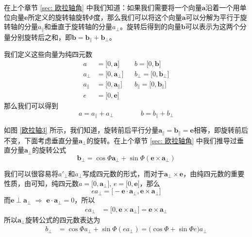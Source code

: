 在上个章节 \ref{sec: 欧拉轴角} 中我们知道：如果我们需要将一个向量$\bm{a}$沿着一个用单位向量$\bm{e}$所定义的旋转轴旋转$\varPhi$度，那么我们可以将这个向量$\bm{a}$可以分解为平行于旋转轴的分量$a_{\parallel}$和垂直于旋转轴的分量$a_{\perp}$。旋转后得到的向量$\bm{b}$可以表示为这两个分量分别旋转后之和，即$\bm{b} = \bm{b}_{\parallel} + \bm{b}_{\perp}$。

我们定义这些向量为纯四元数
\begin{align*}
	a &= \big[ 0, \bm{a} \big]  && b = \big[ 0, \bm{b} \big] \\
	a_\perp &= \big[ 0, \bm{a}_\perp \big] && b_\perp = \big[ 0, \bm{b}_\perp \big] \\
	a_\parallel &= \big[ 0, \bm{a}_\parallel \big] && b_\parallel = \big[ 0, \bm{b}_\parallel \big] \\
	e &= \big[0, \bm{e} \big] 
\end{align*}
那么我们可以得到
\begin{equation*}
	a = a_\parallel + a_\perp \qquad \qquad b = b_\parallel + b_\perp
\end{equation*}

如图 \ref{欧拉轴3} 所示，我们知道，旋转前后平行分量$\bm{a}_{\parallel} = \bm{b}_{\parallel} = \bm{e}$相等，即旋转前后不变，下面考虑垂直分量$\bm{a}_{\perp}$的旋转。在上个章节 \ref{sec: 欧拉轴角} 中我们推导过垂直分量$\bm{a}_{\perp}$的旋转公式
\begin{equation*}
	\bm{b}_{\perp} = \cos \varPhi \bm{a}_\perp + \sin \varPhi (\bm{e} \times \bm{a}_\perp )
\end{equation*}

我们可以很容易将$a'_\perp$和$a_\perp$写成四元数的形式，而对于$\bm{a}_\perp \times \bm{e}$，由纯四元数的重要性质，由可知，纯四元数$a = \big[ 0, \bm{a_\perp}\big], \, e = \big[ 0, \bm{e} \big]$，那么
\begin{equation*}
	ea_\perp = \big[ - \bm{e} \cdot \bm{a}_\perp, \bm{e} \times \bm{a}_\perp \big]
\end{equation*}
而$\bm{e} \perp \bm{a}_\perp \,\, \Rightarrow \,\, \bm{e} \cdot \bm{a}_\perp = 0$，所以
\begin{align*}
	ea_\perp & = \big[ 0, \bm{e} \times \bm{a}_\perp \big] = \bm{e} \times \bm{a}_\perp
\end{align*}
所以$\bm{a}_{\perp}$旋转公式的四元数表达为
\begin{align}
	b_\perp &= \cos \varPhi a_\perp + \sin \varPhi (ea_\perp) = \big( \cos \varPhi + \sin \varPhi e \big) a_\perp 
\end{align}

